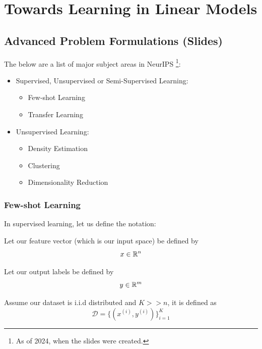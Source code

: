 \chapter{Towards Learning in Linear Models}

\section{Advanced Problem Formulations (Slides)}

The below are a list of major subject areas in NeurIPS \footnote[1][]{As of 2024, when the slides were created.}:
\begin{itemize}[noitemsep]
    \item Supervised, Unsupervised or Semi-Supervised Learning:
    \begin{itemize}[noitemsep]
        \item Few-shot Learning
        \item Transfer Learning
    \end{itemize}
    \item Unsupervised Learning:
    \begin{itemize}[noitemsep]
        \item Density Estimation
        \item Clustering
        \item Dimensionality Reduction
    \end{itemize}
\end{itemize}


\subsection{Few-shot Learning}

In supervised learning, let us define the notation:

\noindent Let our feature vector (which is our input space) be defined by
\begin{equation}
    x \in \mathbb{R}^n
\end{equation}

\noindent Let our output labels be defined by
\begin{equation}
    y \in \mathbb{R}^m
\end{equation}

\noindent  Assume our dataset is i.i.d distributed and  $K >> n$, it is defined as 
\begin{equation}
    \mathcal{D} = \{(x^{(i)}, y^{(i)})\}_{i=1}^K 
\end{equation}

